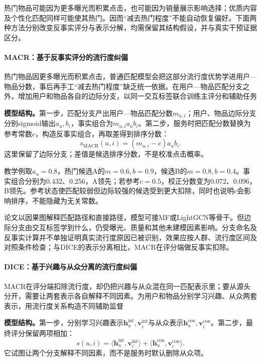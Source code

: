 热门物品可能因为更多曝光而积累点击，也可能因为销量展示影响选择；优质内容及个性化匹配同样可能使其热门。因而“减去热门程度”不能自动恢复偏好。下面两种方法分别改变反事实评分与表示分解，均需保留其结构假设，并与真实干预证据区分。

\paragraph{MACR：基于反事实评分的流行度纠偏}
\label{sec:rs-macr}

热门物品因更多曝光而积累点击，普通匹配模型会把这部分流行度优势学进用户—物品分数，事后再手工“减去热门程度”缺乏统一依据。在用户—物品匹配分支之外，增加用户和物品各自的边际分支，以同一交互标签联合训练主评分和辅助任务

\textbf{模型结构。}第一步，匹配分支产出用户—物品匹配分数$m_{u,i}$；用户、物品边际分支分别sigmoid输出$a_u,b_i$，事实组合为$m_{u,i}a_ub_i$。第二步，服务时把匹配分数替换为参考常数$c$，构造反事实组合，再取差得到排序分数：
\begin{equation}
 s_{\mathrm{MACR}}(u,i)=(m_{u,i}-c)a_ub_i.
 \label{eq:rs-macr}
\end{equation}
这里保留了边际分支；差值是候选排序分数，不是校准点击概率。

教学例取$a_u=0.8$，热门候选A的$m=0.6,b=0.9$，候选B的$m=0.8,b=0.4$。事实组合分别为0.432、0.256，A领先；若参考$c=0.5$，校正分数变为0.072、0.096，B领先。参考状态使匹配较弱但边际较强的候选受到更大扣除，同时也说明$c$会影响排序，不能隐藏为无关常数。

论文以因果图解释匹配路径和直接路径，模型可接MF或LightGCN等骨干。但边际分支由交互标签学到什么，仍受曝光、质量和其他未建模因素影响。分支命名及反事实计算并不单独证明真实流行度原因已被识别，效果应按人群、流行度区间及对照条件检查；与DICE的表示分离相比，MACR在评分端做反事实扣除。

\paragraph{DICE：基于兴趣与从众分离的流行度纠偏}
\label{sec:rs-dice}

MACR在评分端扣除流行度，却仍把兴趣与从众混在同一匹配表示里；要从源头分开，需要让两套表示各自解释不同因素。为用户和物品分别学习兴趣、从众两套表示，用流行度关系构造不同辅助监督

\textbf{模型结构。}第一步，分别学习兴趣表示$\bm h_u^{\mathrm{int}},\bm v_i^{\mathrm{int}}$与从众表示$\bm h_u^{\mathrm{con}},\bm v_i^{\mathrm{con}}$。第二步，最终评分保留两项相加：
\begin{equation}
 s(u,i)=
 \langle\bm h_u^{\mathrm{int}},\bm v_i^{\mathrm{int}}\rangle+
 \langle\bm h_u^{\mathrm{con}},\bm v_i^{\mathrm{con}}\rangle.
 \label{eq:rs-dice}
\end{equation}
它试图让两个分支解释不同因素，而不是服务时默认删除从众项。

